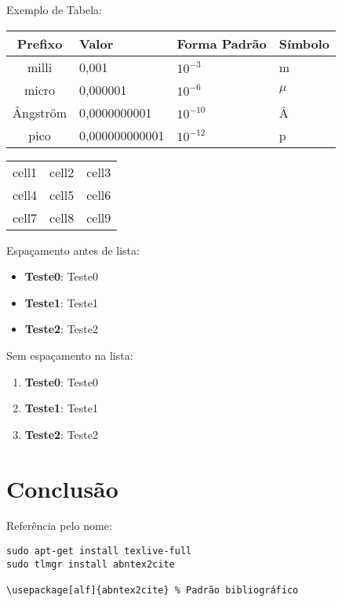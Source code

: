 \documentclass[a4paper,11pt]{article}
\begin{document}
Exemplo de Tabela:
\begin{table}[H]
	\centering 
	\begin{tabular}{c | L{3cm} | C{3cm} | R{3cm} }
		\textbf{Prefixo} & \textbf{Valor} & \textbf{Forma Padrão} & \textbf{Símbolo} \\
		\hline
		milli & 0,001 & $10^{-3}$ & m \\
		micro & 0,000001 & $10^{-6}$ & $\mu$ \\
		Ângström & 0,0000000001 & $10^{-10}$ & Â \\
		pico & 0,000000000001 & $10^{-12}$ & p \\
	\end{tabular}
\end{table}

\begin{center}
	\begin{tabular}{ c|c|c } 
		\hline
		cell1 & cell2 & cell3 \\ 
		cell4 & cell5 & cell6 \\ 
		cell7 & cell8 & cell9 \\ 
		\hline
	\end{tabular}
\end{center}

Espaçamento antes de lista: \vspace{-1em}
\begin{itemize}
	\item \textbf{Teste0}: Teste0
    \item \textbf{Teste1}: Teste1
    \item \textbf{Teste2}: Teste2
\end{itemize}

Sem espaçamento na lista:

\begin{enumerate}[nolistsep]
	\item \textbf{Teste0}: Teste0
	\item \textbf{Teste1}: Teste1
	\item \textbf{Teste2}: Teste2
\end{enumerate}


\section{Conclusão}



Referência pelo nome:
\begin{lstlisting}[]
sudo apt-get install texlive-full
sudo tlmgr install abntex2cite

\usepackage[alf]{abntex2cite} % Padrão bibliográfico
\end{lstlisting}
\end{document}
